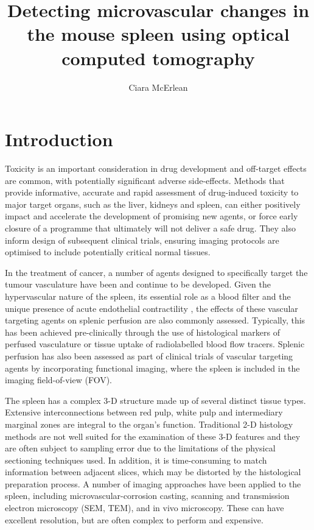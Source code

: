 \documentclass[12pt]{article}
\begin{document}
 
\title{Detecting microvascular changes in the mouse spleen using optical
	computed tomography} 
\author{Ciara McErlean}

\section{Introduction}
\label{sec:intro}



Toxicity is an important consideration in drug development and off-target effects are common, with potentially significant adverse side-effects. Methods that provide informative, accurate and rapid assessment of drug-induced toxicity to major target organs, such as the liver, kidneys and spleen, can either positively impact and accelerate the development of promising new agents, or force early closure of a programme that ultimately will not deliver a safe drug. They also inform design of subsequent clinical trials, ensuring imaging protocols are optimised to include potentially critical normal tissues.

	
In the treatment of cancer, a number of agents designed to specifically target the tumour vasculature have been and continue to be developed. Given the hypervascular nature of the spleen, its essential role as a blood filter and the unique presence of acute endothelial contractility \cite{raganspontaneous1988}, the effects of these vascular targeting agents on splenic perfusion are also commonly assessed. Typically, this has been achieved pre-clinically through the use of histological markers of perfused vasculature or tissue uptake of radiolabelled blood flow tracers. \cite{cullistumour2006, horsmanvascular2003} Splenic perfusion has also been assessed as part of clinical trials of vascular targeting agents by incorporating functional imaging, where the spleen is included in the imaging field-of-view (FOV). \cite{andersonassessment2003, evelhochmagnetic2004} 

The spleen has a complex 3-D structure made up of several distinct tissue types. Extensive interconnections between red pulp, white pulp and intermediary marginal zones are integral to the organ's function. \cite{groomthe1987} Traditional 2-D histology methods are not well suited for the examination of these 3-D features and they are often subject to sampling error due to the limitations of the physical sectioning techniques used. In addition, it is time-consuming to match information between adjacent slices, which may be distorted by the histological preparation process. A number of imaging approaches have been applied to the spleen, including microvascular-corrosion casting, scanning and transmission electron microscopy (SEM, TEM), and in vivo microscopy. \cite{groomthe1987}  These can have excellent resolution, but are often complex to perform and expensive.
\end{document}
